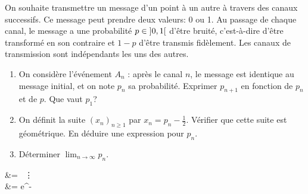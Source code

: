 \begin{td-exo}[] %
    On souhaite transmettre un message d'un point à un autre
    à travers des canaux successifs. Ce message peut prendre
    deux valeurs: 0 ou 1. Au passage de chaque canal, le 
    message a une probabilité \(p\in\mathopen{}\left]0,1\right[\mathclose{}\) d'être bruité,
    c'est-à-dire d'être transformé en son contraire et \(1-p\)
    d'être transmis fidèlement. Les canaux de transmission
    sont indépendants les uns des autres.
    \begin{enumerate}
        \item On considère l'événement \(A_n\) : \og{}
        après le canal \(n\), le message est identique au
        message initial\fg{}, et on note \(p_n\) sa probabilité.
        Exprimer \(p_{n+1}\) en fonction de \(p_n\) et de \(p\).
        Que vaut \(p_1\)?

        \item On définit la suite \((x_n)_{n\geq 1}\) par 
        \(x_n = p_n-\frac12\). Vérifier que cette suite
        est géométrique. En déduire une expression pour
        \(p_n\).

        \item Déterminer \(\lim_{n\to\infty} p_n\).
    \end{enumerate}
\end{td-exo}
&= \ \vdots\\
&= \frac{\lambda}{\lambda+\mu} \times e^{-\la}
